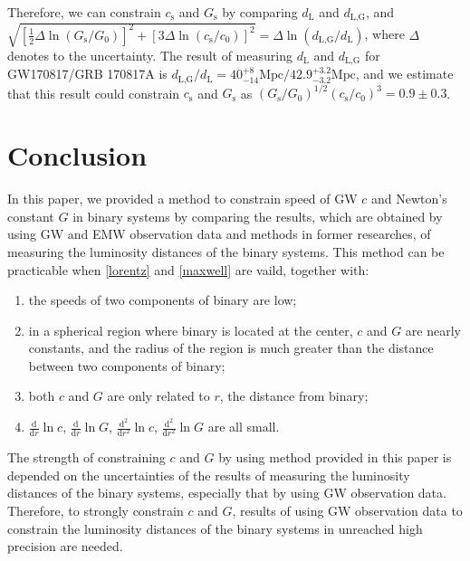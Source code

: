 \documentclass{article}
\def\d{\mathrm{d}}
\begin{document}
Therefore, we can constrain $c_\text{s}$ and $G_\text{s}$ by comparing $d_\text{L}$ and $d_\text{L,G}$, and $\sqrt{[\frac{1}{2}\Delta\!\ln(G_\text{s}/G_0)]^2+[3\Delta\!\ln(c_\text{s}/c_0)]^2}=\Delta\!\ln(d_\text{L,G}/d_\text{L})$, where $\Delta$ denotes to the uncertainty. The result of measuring $d_\text{L}$ and $d_\text{L,G}$ for GW170817/GRB 170817A is $d_\text{L,G}/d_\text{L}=40_{-14}^{+8}\text{Mpc}/42.9_{-3.2}^{+3.2}\text{Mpc}$, and we estimate that this result could constrain $c_\text{s}$ and $G_\text{s}$ as $(G_\text{s}/G_0)^{1/2}(c_\text{s}/c_0)^3=0.9 \pm 0.3$.

\section{Conclusion}
In this paper, we provided a method to constrain speed of GW $c$ and Newton's constant $G$ in binary systems by comparing the results, which are obtained by using GW and EMW observation data and methods in former researches, of measuring the luminosity distances of the binary systems. This method can be practicable when \eqref{lorentz} and \eqref{maxwell} are vaild, together with:
\begin{enumerate}
    \item the speeds of two components of binary are low;
    \item in a spherical region where binary is located at the center, $c$ and $G$ are nearly constants, and the radius of the region is much greater than the distance between two components of binary;
    \item both $c$ and $G$ are only related to $r$, the distance from binary;
    \item $\frac{\d}{\d r}\ln c$, $\frac{\d}{\d r}\ln G$, $\frac{\d^2}{\d r^2}\ln c$, $\frac{\d^2}{\d r^2}\ln G$ are all small.
\end{enumerate}
The strength of constraining $c$ and $G$ by using method provided in this paper is depended on the uncertainties of the results of measuring the luminosity distances of the binary systems, especially that by using GW observation data. Therefore, to strongly constrain $c$ and $G$, results of using GW observation data to constrain the luminosity distances of the binary systems in unreached high precision are needed.
\end{document}
